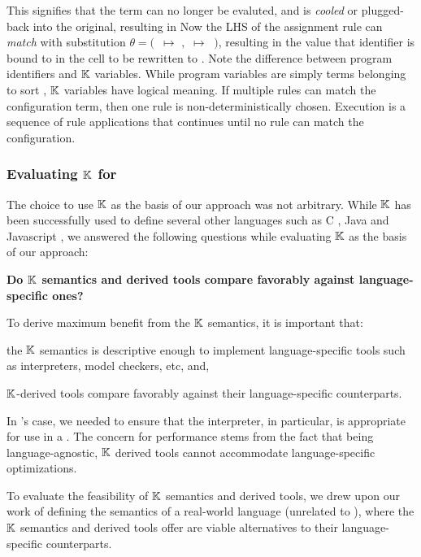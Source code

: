 This signifies that the term can no longer be evaluted, and is \emph{cooled}
or plugged-back into the original, resulting in 
Now the LHS of the assignment rule can \emph{match} with substitution $\theta =
($\ $ \mapsto $ $,$  $\mapsto\ $ $)$, resulting in the value that identifier 
is bound to in the  cell to be rewritten to .
Note the difference between program identifiers and $\mathbb{K}$ variables. While
program variables are simply terms belonging to sort ,
$\mathbb{K}$ variables have logical meaning. If multiple rules can match
the configuration term, then one rule is non-deterministically chosen.
Execution is a sequence of rule applications that continues until no
rule can match the configuration.

\subsubsection{Evaluating $\mathbb{K}$ for \MediK}

The choice to use $\mathbb{K}{}$ as the basis of our approach was not arbitrary.
While $\mathbb{K}$ has been successfully used to define several other languages
such as C \cite{HathhornPLDI15}, Java \cite{BogdanasPOPL15} and Javascript
\cite{ParkPLDI15}, we answered the following questions while evaluating $\mathbb{K}$
as the basis of our approach:

\textbf{Do $\mathbb{K}$ semantics and derived tools compare favorably against language-specific ones?}

To derive maximum benefit from the $\mathbb{K}$ semantics, it is important that:
\begin{enumerate*}[label=(\roman*)]
  \item the $\mathbb{K}$ semantics is descriptive enough to implement language-specific
    tools such as interpreters, model checkers, etc, and,
  \item $\mathbb{K}$-derived tools compare favorably against their language-specific
    counterparts.
\end{enumerate*}
In \MediK{}'s case, we needed to ensure that the interpreter,
in particular, is appropriate for
use in a \CDSS{}. The concern for performance stems from the fact
that being language-agnostic, $\mathbb{K}{}$ derived tools
cannot accommodate language-specific optimizations.

To evaluate the feasibility of $\mathbb{K}$ semantics and derived tools, we
drew upon our work of defining the semantics of a real-world language
(unrelated to \MediK{}), where the $\mathbb{K}$ semantics and derived tools offer
are viable alternatives to their language-specific counterparts.

